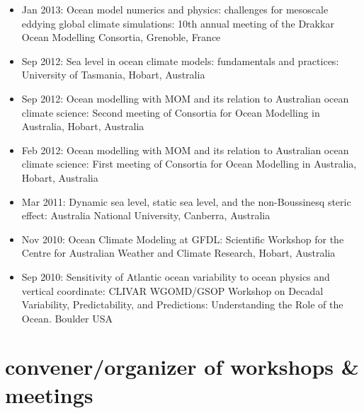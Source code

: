 \documentclass{article}
\begin{document}
\begin{itemize}[leftmargin=*]
\item Jan 2013: {\sc Ocean model numerics and physics: challenges for
    mesoscale eddying global climate simulations}: 10th annual meeting
  of the Drakkar Ocean Modelling Consortia, Grenoble, France

\item Sep 2012: {\sc Sea level in ocean climate models: fundamentals
    and practices}: University of Tasmania, Hobart, Australia

\item Sep 2012: {\sc Ocean modelling with MOM and its relation to
    Australian ocean climate science}: Second meeting of Consortia for
  Ocean Modelling in Australia, Hobart, Australia

\item Feb 2012: {\sc Ocean modelling with MOM and its relation to
    Australian ocean climate science}: First meeting of Consortia for
  Ocean Modelling in Australia, Hobart, Australia

\item Mar 2011: {\sc Dynamic sea level, static sea level, and the
    non-Boussinesq steric effect}: Australia National University,
  Canberra, Australia

\item Nov 2010:  {\sc Ocean Climate Modeling at GFDL}: Scientific
  Workshop for the Centre for Australian Weather and Climate Research,
  Hobart, Australia

\item Sep 2010:  {\sc Sensitivity of Atlantic ocean variability to
    ocean physics and vertical coordinate}: CLIVAR WGOMD/GSOP Workshop
  on Decadal Variability, Predictability, and Predictions:
  Understanding the Role of the Ocean. Boulder USA 




\end{itemize}


\section*{\sc  \color{Maroon}  convener/organizer of workshops \& meetings}
\vspace{-.3cm}
\end{document}
